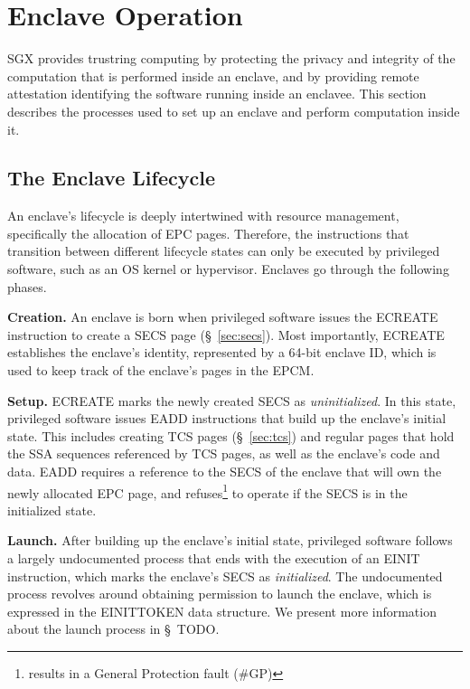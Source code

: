 \section{Enclave Operation}

SGX provides trustring computing by protecting the privacy and integrity of the
computation that is performed inside an enclave, and by providing remote
attestation identifying the software running inside an enclavee. This section
describes the processes used to set up an enclave and perform computation
inside it.


\subsection{The Enclave Lifecycle}
\label{sec:lifecycle}

An enclave's lifecycle is deeply intertwined with resource management,
specifically the allocation of EPC pages. Therefore, the instructions that
transition between different lifecycle states can only be executed by
privileged software, such as an OS kernel or hypervisor. Enclaves go through
the following phases.


\textbf{Creation.} An enclave is born when privileged software issues the
ECREATE instruction to create a SECS page (\S~\ref{sec:secs}). Most
importantly, ECREATE establishes the enclave's identity, represented by a
64-bit enclave ID, which is used to keep track of the enclave's pages in the
EPCM.

\textbf{Setup.} ECREATE marks the newly created SECS as \textit{uninitialized}.
In this state, privileged software issues EADD instructions that build up the
enclave's initial state. This includes creating TCS pages (\S~\ref{sec:tcs})
and regular pages that hold the SSA sequences referenced by TCS pages, as well
as the enclave's code and data. EADD requires a reference to the SECS of the
enclave that will own the newly allocated EPC page, and
refuses\footnote{results in a General Protection fault (\#GP)} to operate if
the SECS is in the initialized state.

\textbf{Launch.} After building up the enclave's initial state, privileged
software follows a largely undocumented process that ends with the execution of
an EINIT instruction, which marks the enclave's SECS as \textit{initialized}.
The undocumented process revolves around obtaining permission to launch the
enclave, which is expressed in the EINITTOKEN data structure. We present more
information about the launch process in \S~TODO.

